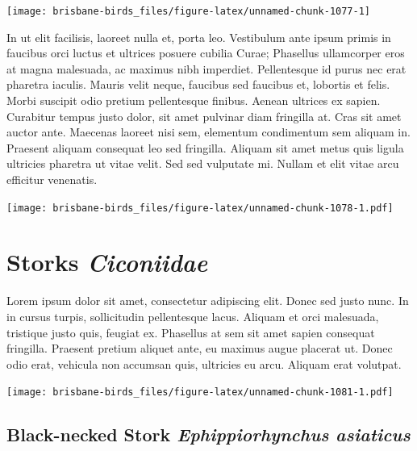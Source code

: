 \documentclass[]{book}
\let\origfigure\figure
\let\endorigfigure\endfigure
\renewenvironment{figure}[1][2] {
  \expandafter\origfigure\expandafter[H]
} {
  \endorigfigure
}
\begin{document}
\begin{figure}
\texttt{[image: brisbane-birds\_files/figure-latex/unnamed-chunk-1077-1]} \caption{insert figure caption}\label{fig:unnamed-chunk-1077}
\end{figure}

In ut elit facilisis, laoreet nulla et, porta leo. Vestibulum ante ipsum
primis in faucibus orci luctus et ultrices posuere cubilia Curae;
Phasellus ullamcorper eros at magna malesuada, ac maximus nibh
imperdiet. Pellentesque id purus nec erat pharetra iaculis. Mauris velit
neque, faucibus sed faucibus et, lobortis et felis. Morbi suscipit odio
pretium pellentesque finibus. Aenean ultrices ex sapien. Curabitur
tempus justo dolor, sit amet pulvinar diam fringilla at. Cras sit amet
auctor ante. Maecenas laoreet nisi sem, elementum condimentum sem
aliquam in. Praesent aliquam consequat leo sed fringilla. Aliquam sit
amet metus quis ligula ultricies pharetra ut vitae velit. Sed sed
vulputate mi. Nullam et elit vitae arcu efficitur venenatis.

\begin{figure}
\centering
\texttt{[image: brisbane-birds\_files/figure-latex/unnamed-chunk-1078-1.pdf]}
\caption{\label{fig:unnamed-chunk-1078}insert figure caption}
\end{figure}

\chapter{\texorpdfstring{Storks
\emph{Ciconiidae}}{Storks Ciconiidae}}\label{storks-ciconiidae}

Lorem ipsum dolor sit amet, consectetur adipiscing elit. Donec sed justo
nunc. In in cursus turpis, sollicitudin pellentesque lacus. Aliquam et
orci malesuada, tristique justo quis, feugiat ex. Phasellus at sem sit
amet sapien consequat fringilla. Praesent pretium aliquet ante, eu
maximus augue placerat ut. Donec odio erat, vehicula non accumsan quis,
ultricies eu arcu. Aliquam erat volutpat.

\texttt{[image: brisbane-birds\_files/figure-latex/unnamed-chunk-1081-1.pdf]}

\section{\texorpdfstring{Black-necked Stork \emph{Ephippiorhynchus
asiaticus}}{Black-necked Stork Ephippiorhynchus asiaticus}}\label{black-necked-stork-ephippiorhynchus-asiaticus}
\end{document}
